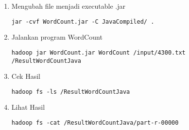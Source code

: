 \documentclass[a4paper]{tufte-handout}
\begin{document}
\begin{enumerate}
\item Mengubah file menjadi executable .jar
\begin{lstlisting}[language=Terminal]
 jar -cvf WordCount.jar -C JavaCompiled/ .
\end{lstlisting}

\item Jalankan program WordCount
\begin{lstlisting}[language=Terminal]
 hadoop jar WordCount.jar WordCount /input/4300.txt /ResultWordCountJava
\end{lstlisting}

\item Cek Hasil
\begin{lstlisting}[language=Terminal]
 hadoop fs -ls /ResultWordCountJava
\end{lstlisting}

\item Lihat Hasil
\begin{lstlisting}[language=Terminal]
 hadoop fs -cat /ResultWordCountJava/part-r-00000
\end{lstlisting} 
\end{enumerate}


\hrulefill

\clearpage
{}
\end{document}
